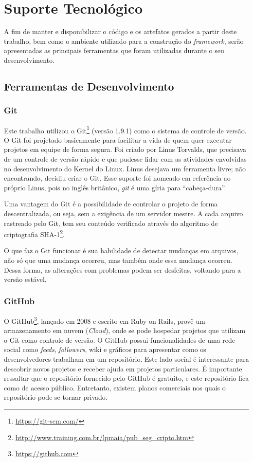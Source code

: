 \chapter{Suporte Tecnológico}
\label{chapter:Suporte_Tecnologico}

A fim de manter e disponibilizar o código e os artefatos gerados a partir deste trabalho, bem como o ambiente utilizado para a construção do \textit{framework}, serão apresentadas as principais ferramentas que foram utilizadas durante o seu desenvolvimento.

\section{Ferramentas de Desenvolvimento}

\subsection{Git}

Este trabalho utilizou o Git\footnote{\url{https://git-scm.com/}} (versão 1.9.1) como o sistema de controle de versão. O Git foi projetado basicamente para facilitar a vida de quem quer executar projetos em equipe de forma segura. Foi criado por Linus Torvalds, que precisava de um controle de versão rápido e que pudesse lidar com as atividades envolvidas no desenvolvimento do Kernel do Linux. Linus desejava um ferramenta livre; não encontrando, decidiu criar o Git. Esse suporte foi nomeado em referência ao próprio Linus, pois no inglês britânico, \textit{git} é uma gíria para ``cabeça-dura''.

Uma vantagem do Git é a possibilidade de controlar o projeto de forma descentralizada, ou seja, sem a exigência de um servidor mestre. A cada arquivo rastreado pelo Git, tem seu conteúdo verificado através do algoritmo de criptografia SHA-1\footnote{\url{http://www.training.com.br/lpmaia/pub_seg_cripto.htm}}.

O que faz o Git funcionar é sua habilidade de detectar mudanças em arquivos, não só que uma mudança ocorreu, mas também onde essa mudança ocorreu. Dessa forma, as alterações com problemas podem ser desfeitas, voltando para a versão estável.

\subsection{GitHub}

O GitHub\footnote{\url{https://github.com}}, lançado em 2008 e escrito em Ruby on Rails, provê um armazenamento em nuvem (\textit{Cloud}), onde se pode hospedar projetos que utilizam o Git como controle de versão. O GitHub possui funcionalidades de uma rede social como \textit{feeds}, \textit{followers}, wiki e gráficos para apresentar como os desenvolvedores trabalham em um repositório. Este lado social é interessante para descobrir novos projetos e receber ajuda em projetos particulares. É importante ressaltar que o repositório fornecido pelo GitHub é gratuito, e este repositório fica como de acesso público. Entretanto, existem planos comerciais nos quais o repositório pode se tornar privado.

